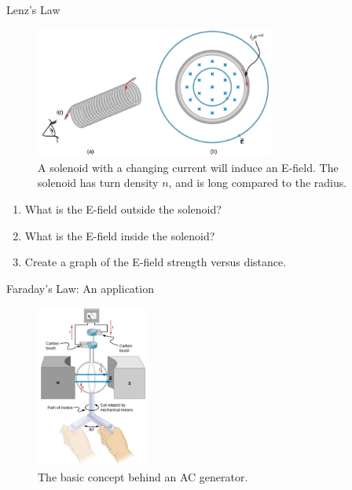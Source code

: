 \documentclass{beamer}
\begin{document}
\begin{frame}{Lenz's Law}
\small
\begin{figure}
\centering
\includegraphics[width=0.7\textwidth]{figures/loop3.png}
\caption{\label{fig:loop5} A solenoid with a changing current will induce an E-field.  The solenoid has turn density $n$, and is long compared to the radius.}
\end{figure}
\begin{enumerate}
\item What is the E-field outside the solenoid?
\item What is the E-field inside the solenoid?
\item Create a graph of the E-field strength versus distance.
\end{enumerate}
\end{frame}

\begin{frame}{Faraday's Law: An application}
\small
\begin{figure}
\centering
\includegraphics[width=0.33\textwidth]{figures/gen1.png}
\caption{\label{fig:gen1} The basic concept behind an AC generator.}
\end{figure}
\end{frame}
\end{document}
